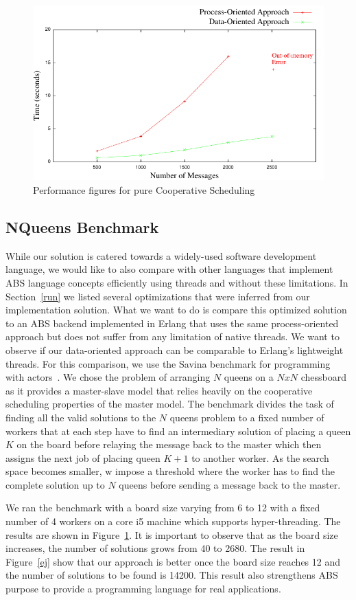 \begin{figure}
	\centering
	\includegraphics[scale=.68]{jaj8.pdf}
	\caption{Performance figures for pure Cooperative Scheduling}
	\label{jj}
\end{figure}

\subsection{NQueens Benchmark}
\par While our solution is catered towards a widely-used software development language, we would like to also compare with other languages that implement ABS language concepts efficiently using threads and without these limitations. In Section~\ref{run} we listed several optimizations that were inferred from our implementation solution. What we want to do is compare this optimized solution to an ABS backend implemented in Erlang that uses the same process-oriented approach but does not suffer from any limitation of native threads. We want to observe if our data-oriented approach can be comparable to Erlang's lightweight threads. For this comparison, we use the Savina benchmark for programming with actors~\cite{savina}.  We chose the problem of arranging $N$ queens on a $NxN$ chessboard as it provides a master-slave model that relies heavily on the cooperative scheduling properties of the master model.  The benchmark divides the task of finding all the valid solutions to the $N$ queens problem to a fixed number of workers that at each step have to find an intermediary solution of placing a queen $K$ on the board before relaying the message back to the master which then assigns the next job of placing queen $K+1$ to another worker. As the search space becomes smaller, w impose a threshold where the worker has to find the complete solution up to $N$ queens before sending a message back to the master. 
\par We ran the benchmark with a board size varying from 6 to 12 with a fixed number of 4 workers on a core i5 machine which supports hyper-threading. The results are shown in Figure~\ref{jj}. It is important to observe that as the board size increases, the number of solutions grows from 40 to 2680. The result in Figure~\ref{ej} show that our approach is better once the board size reaches 12 and the number of solutions to be found is 14200. This result also strengthens ABS purpose to provide a programming language for real applications.

